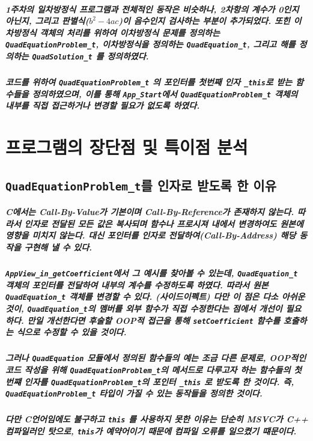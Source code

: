 \documentclass{article}
\begin{document}
    \subparagraph{\normalfont1주차의 일차방정식 프로그램과 전체적인 동작은 비슷하나, 2차항의 계수가 0인지 아닌지, 그리고 판별식($b^2-4ac$)이 음수인지 검사하는 부분이 추가되었다. 또힌 이차방정식 객체의 처리를 위하여 이차방정식 문제를 정의하는 \texttt{QuadEquationProblem\_t}, 이차방정식을 정의하는 \texttt{QuadEquation\_t}, 그리고 해를 정의하는 \texttt{QuadSolution\_t} 를 정의하였다.}

    \subparagraph{ 코드를 위하여 \texttt{QuadEquationProblem\_t} 의 포인터를 첫번째 인자 \texttt{\_this}로 받는 함수들을 정의하였으며, 이를 통해 \texttt{App\_Start}에서 \texttt{QuadEquationProblem\_t} 객체의 내부를 직접 접근하거나 변경할 필요가 없도록 하였다.}

    \section{프로그램의 장단점 및 특이점 분석}
    
    \subsection{\texttt{QuadEquationProblem\_t\*}를 인자로 받도록 한 이유}

    \subparagraph{\normalfont C에서는 Call-By-Value가 기본이며 Call-By-Reference가 존재하지 않는다. 따라서 인자로 전달된 모든 값은 복사되며 함수나 프로시져 내에서 변경하여도 원본에 영향을 미치지 않는다. 대신 포인터를 인자로 전달하여(Call-By-Address) 해당 동작을 구현해 낼 수 있다.}

    \subparagraph{\normalfont \texttt{AppView\_in\_getCoefficient}에서 그 예시를 찾아볼 수 있는데, \texttt{QuadEquation\_t} 객체의 포인터를 전달하여 내부의 계수를 수정하도록 하였다. 따라서 원본 \texttt{QuadEquation\_t} 객체를 변경할 수 있다. (사이드이펙트) 다만 이 점은 다소 아쉬운 것이, \texttt{QuadEquation\_t}의 멤버를 외부 함수가 직접 수정한다는 점에서 개선이 필요하다. 만일 개선한다면 후술할 OOP적 접근을 통해 \texttt{setCoefficient} 함수를 호출하는 식으로 수정할 수 있을 것이다.}

    \subparagraph{\normalfont 그러나 \texttt{QuadEquation} 모듈에서 정의된 함수들의 예는 조금 다른 문제로, OOP적인 코드 작성을 위해 \texttt{QuadEquationProblem\_t}의 메서드로 다루고자 하는 함수들의 첫번쨰 인자를 \texttt{QuadEquationProblem\_t}의 포인터 \texttt{\_this} 로 받도록 한 것이다. 즉, \texttt{QuadEquationProblem\_t} 타입이 가질 수 있는 동작들을 정의한 것이다.}

    \subparagraph{\normalfont 다만 C언어임에도 불구하고 \texttt{this} 를 사용하지 못한 이유는 단순히 MSVC가 C++ 컴파일러인 탓으로, \texttt{this}가 예약어이기 때문에 컴파일 오류를 일으켰기 떄문이다.}
\end{document}
